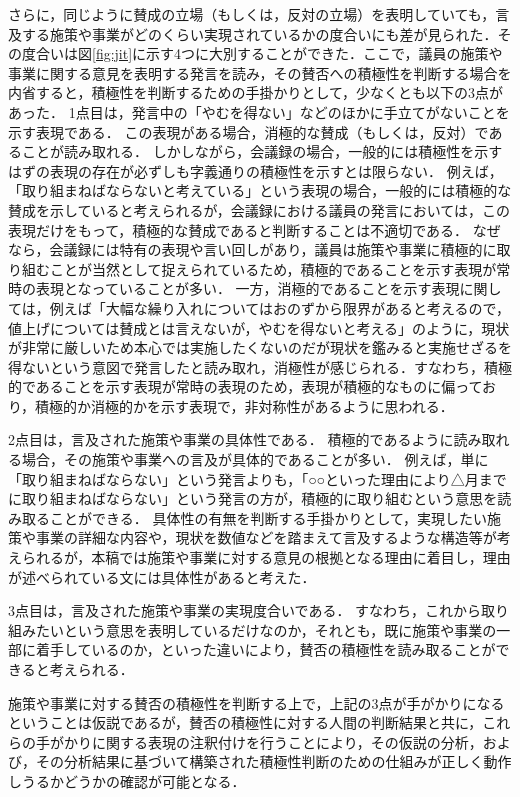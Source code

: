 \documentclass[japanese]{jnlp_1.4}
\begin{document}
さらに，同じように賛成の立場（もしくは，反対の立場）を表明していても，言及する施策や事業がどのくらい実現されているかの度合いにも差が見られた．その度合いは図\ref{fig:jit}に示す4つに大別することができた．ここで，議員の施策や事業に関する意見を表明する発言を読み，その賛否への積極性を判断する場合を内省すると，積極性を判断するための手掛かりとして，少なくとも以下の3点があった．
1点目は，発言中の「やむを得ない」などのほかに手立てがないことを示す表現である．
この表現がある場合，消極的な賛成（もしくは，反対）であることが読み取れる．
しかしながら，会議録の場合，一般的には積極性を示すはずの表現の存在が必ずしも字義通りの積極性を示すとは限らない．
例えば，「取り組まねばならないと考えている」という表現の場合，一般的には積極的な賛成を示していると考えられるが，会議録における議員の発言においては，この表現だけをもって，積極的な賛成であると判断することは不適切である．
なぜなら，会議録には特有の表現や言い回しがあり，議員は施策や事業に積極的に取り組むことが当然として捉えられているため，積極的であることを示す表現が常時の表現となっていることが多い．
一方，消極的であることを示す表現に関しては，例えば「大幅な繰り入れについてはおのずから限界があると考えるので，値上げについては賛成とは言えないが，やむを得ないと考える」のように，現状が非常に厳しいため本心では実施したくないのだが現状を鑑みると実施せざるを得ないという意図で発言したと読み取れ，消極性が感じられる．すなわち，積極的であることを示す表現が常時の表現のため，表現が積極的なものに偏っており，積極的か消極的かを示す表現で，非対称性があるように思われる．

2点目は，言及された施策や事業の具体性である．
積極的であるように読み取れる場合，その施策や事業への言及が具体的であることが多い．
例えば，単に「取り組まねばならない」という発言よりも，「○○といった理由により△月までに取り組まねばならない」という発言の方が，積極的に取り組むという意思を読み取ることができる．
具体性の有無を判断する手掛かりとして，実現したい施策や事業の詳細な内容や，現状を数値などを踏まえて言及するような構造等が考えられるが，本稿では施策や事業に対する意見の根拠となる理由に着目し，理由が述べられている文には具体性があると考えた．

3点目は，言及された施策や事業の実現度合いである．
すなわち，これから取り組みたいという意思を表明しているだけなのか，それとも，既に施策や事業の一部に着手しているのか，といった違いにより，賛否の積極性を読み取ることができると考えられる．

施策や事業に対する賛否の積極性を判断する上で，上記の3点が手がかりになるということは仮説であるが，賛否の積極性に対する人間の判断結果と共に，これらの手がかりに関する表現の注釈付けを行うことにより，その仮説の分析，および，その分析結果に基づいて構築された積極性判断のための仕組みが正しく動作しうるかどうかの確認が可能となる．
\end{document}
